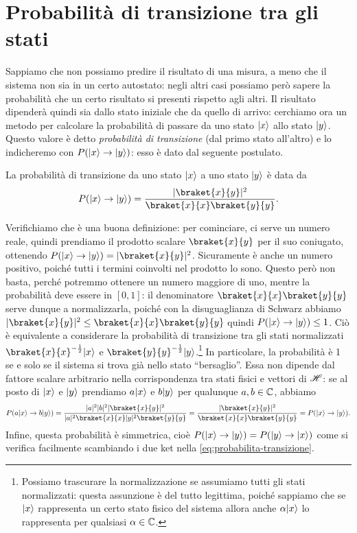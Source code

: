 \section{Probabilità di transizione tra gli stati}
Sappiamo che non possiamo predire il risultato di una misura, a meno che il sistema non sia in un certo autostato: negli altri casi possiamo però sapere la probabilità che un certo risultato si presenti rispetto agli altri.
Il risultato dipenderà quindi sia dallo stato iniziale che da quello di arrivo: cerchiamo ora un metodo per calcolare la probabilità di passare da uno stato $\lvert x\rangle$ allo stato $\lvert y\rangle$.
Questo valore è detto \emph{probabilità di transizione} (dal primo stato all'altro) e lo indicheremo con $P(\lvert x\rangle\to\lvert y\rangle)$: esso è dato dal seguente postulato.
\begin{postulato}
    La probabilità di transizione da uno stato $\lvert x\rangle$ a uno stato $\lvert y\rangle$ è data da
    \begin{equation}
        P(\ket{x}\to\ket{y})=\frac{\abs{\braket{x}{y}}^2}{\braket{x}{x}\braket{y}{y}}.
        \label{eq:probabilita-transizione}
    \end{equation}
\end{postulato}
Verifichiamo che è una buona definizione: per cominciare, ci serve un numero reale, quindi prendiamo il prodotto scalare $\braket{x}{y}$ per il suo coniugato, ottenendo $P(\ket{x}\to\ket{y})=\abs{\braket{x}{y}}^2$.
Sicuramente è anche un numero positivo, poich\'e tutti i termini coinvolti nel prodotto lo sono.
Questo però non basta, perch\'e potremmo ottenere un numero maggiore di uno, mentre la probabilità deve essere in $[0,1]$: il denominatore $\braket{x}{x}\braket{y}{y}$ serve dunque a normalizzarla, poich\'e con la disuguaglianza di Schwarz abbiamo $\abs{\braket{x}{y}}^2\leq\braket{x}{x}\braket{y}{y}$ quindi $P(\lvert x\rangle\to\lvert y\rangle)\le 1$.
Ciò è equivalente a considerare la probabilità di transizione tra gli stati normalizzati $\braket{x}{x}^{-\frac12}\ket{x}$ e $\braket{y}{y}^{-\frac12}\ket{y}$.\footnote{
    Possiamo trascurare la normalizzazione se assumiamo tutti gli stati normalizzati: questa assunzione è del tutto legittima, poich\'e sappiamo che se $\lvert x\rangle$ rappresenta un certo stato fisico del sistema allora anche $\alpha\lvert x\rangle$ lo rappresenta per qualsiasi $\alpha\in\mathbb{C}$.
}
In particolare, la probabilità è 1 se e solo se il sistema si trova già nello stato ``bersaglio''.
Essa non dipende dal fattore scalare arbitrario nella corrispondenza tra stati fisici e vettori di $\mathscr H$: se al posto di $\lvert x\rangle$ e $\lvert y\rangle$ prendiamo $a\lvert x\rangle$ e $b\lvert y\rangle$ per qualunque $a,b\in\mathbb{C}$, abbiamo
\begin{equation}
	P(a\ket{x}\to b\ket{y})=\frac{\abs{a}^2\abs{b}^2\abs{\braket{x}{y}}^2}{\abs{a}^2\braket{x}{x}\abs{y}^2\braket{y}{y}}=\frac{\abs{\braket{x}{y}}^2}{\braket{x}{x}\braket{y}{y}}=P(\ket{x}\to\ket{y}).
\end{equation}
Infine, questa probabilità è simmetrica, cioè $P(\lvert x\rangle\to\lvert y\rangle)=P(\lvert y\rangle\to\lvert x\rangle)$ come si verifica facilmente scambiando i due ket nella \eqref{eq:probabilita-transizione}.

